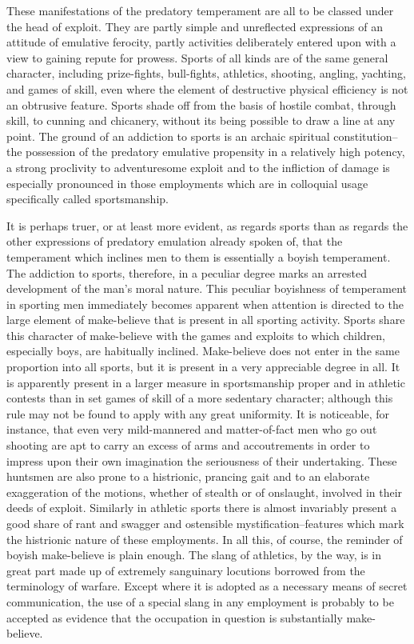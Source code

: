 \documentclass[12pt]{report}
\begin{document}
These manifestations of the predatory temperament are all to be classed
under the head of exploit. They are partly simple and unreflected
expressions of an attitude of emulative ferocity, partly activities
deliberately entered upon with a view to gaining repute for prowess.
Sports of all kinds are of the same general character, including
prize-fights, bull-fights, athletics, shooting, angling, yachting,
and games of skill, even where the element of destructive physical
efficiency is not an obtrusive feature. Sports shade off from the basis
of hostile combat, through skill, to cunning and chicanery, without its
being possible to draw a line at any point. The ground of an addiction
to sports is an archaic spiritual constitution--the possession of the
predatory emulative propensity in a relatively high potency, a strong
proclivity to adventuresome exploit and to the infliction of damage is
especially pronounced in those employments which are in colloquial usage
specifically called sportsmanship.

It is perhaps truer, or at least more evident, as regards sports than as
regards the other expressions of predatory emulation already spoken of,
that the temperament which inclines men to them is essentially a boyish
temperament. The addiction to sports, therefore, in a peculiar degree
marks an arrested development of the man's moral nature. This peculiar
boyishness of temperament in sporting men immediately becomes apparent
when attention is directed to the large element of make-believe that
is present in all sporting activity. Sports share this character of
make-believe with the games and exploits to which children, especially
boys, are habitually inclined. Make-believe does not enter in the same
proportion into all sports, but it is present in a very appreciable
degree in all. It is apparently present in a larger measure in
sportsmanship proper and in athletic contests than in set games of skill
of a more sedentary character; although this rule may not be found to
apply with any great uniformity. It is noticeable, for instance, that
even very mild-mannered and matter-of-fact men who go out shooting are
apt to carry an excess of arms and accoutrements in order to impress
upon their own imagination the seriousness of their undertaking.
These huntsmen are also prone to a histrionic, prancing gait and to
an elaborate exaggeration of the motions, whether of stealth or of
onslaught, involved in their deeds of exploit. Similarly in athletic
sports there is almost invariably present a good share of rant and
swagger and ostensible mystification--features which mark the histrionic
nature of these employments. In all this, of course, the reminder of
boyish make-believe is plain enough. The slang of athletics, by the way,
is in great part made up of extremely sanguinary locutions borrowed from
the terminology of warfare. Except where it is adopted as a necessary
means of secret communication, the use of a special slang in any
employment is probably to be accepted as evidence that the occupation in
question is substantially make-believe.
\end{document}
